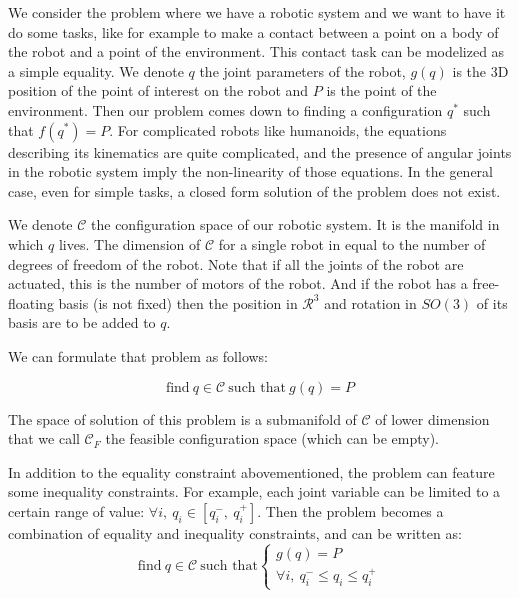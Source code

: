 
We consider the problem where we have a robotic system and we want to have it do some tasks, like for example to make a contact between a point on a body of the robot and a point of the environment.
This contact task can be modelized as a simple equality.
We denote $q$ the joint parameters of the robot, $g(q)$ is the 3D position of the point of interest on the robot and $P$ is the point of the environment.
Then our problem comes down to finding a configuration $q^*$ such that $f(q^*) = P$.
For complicated robots like humanoids, the equations describing its kinematics are quite complicated, and the presence of angular joints in the robotic system imply the non-linearity of those equations.
In the general case, even for simple tasks, a closed form solution of the problem does not exist.

We denote $\mathcal{C}$ the configuration space of our robotic system. It is the manifold in which $q$ lives. The dimension of $\mathcal{C}$ for a single robot in equal to the number of degrees of freedom of the robot. Note that if all the joints of the robot are actuated, this is the number of motors of the robot. And if the robot has a free-floating basis (is not fixed) then the position in $\mathcal{R}^3$ and rotation in $SO(3)$ of its basis are to be added to $q$.

We can formulate that problem as follows:

\begin{equation}
  \text{find}\ q\in\mathcal{C}\ \text{such that}\ g(q)=P
\end{equation}

The space of solution of this problem is a submanifold of $\mathcal{C}$ of lower dimension that we call ${\mathcal{C}}_F$ the feasible configuration space (which can be empty).

In addition to the equality constraint abovementioned, the problem can feature some inequality constraints.
For example, each joint variable can be limited to a certain range of value: $\forall i,\ q_i\in [q_i^-,\ q_i^+]$. Then the problem becomes a combination of equality and inequality constraints, and can be written as:
\begin{equation}
  \text{find}\ q\in\mathcal{C}\ \text{such that}\left\{
  \begin{array}{l}
    g(q)=P \\
    \forall i,\ q_i^- \leq q_i \leq q_i^+
  \end{array}
  \right.
\end{equation}

